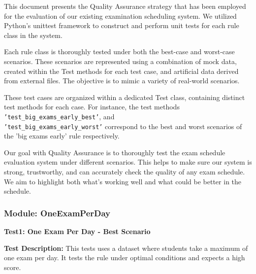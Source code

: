  This document presents the Quality Assurance strategy that has been employed for the evaluation
of our existing examination scheduling system. We utilized Python's unittest framework to
construct and perform unit tests for each rule class in the system.


\vspace{\baselineskip}

Each rule class is thoroughly tested under both the best-case and worst-case scenarios. These
scenarios are represented using a combination of mock data, created within the Test methods for
each test case, and artificial data derived from external files. The objective is to mimic a variety of
real-world scenarios.


\vspace{\baselineskip}

These test cases are organized within a dedicated Test class, containing distinct test methods for
each case. For instance, the test methods \texttt{'test\_big\_exams\_early\_best'},  and  \\ 
\texttt{'test\_big\_exams\_early\_worst'} correspond to the best and worst scenarios of the 'big exams early'
rule respectively.



\vspace{\baselineskip}

Our goal with Quality Assurance is to thoroughly test the exam schedule evaluation system under
different scenarios. This helps to make sure our system is strong, trustworthy, and can accurately
check the quality of any exam schedule. We aim to highlight both what's working well and what
could be better in the schedule.

\subsubsection{Module: OneExamPerDay}

 
\vspace{\baselineskip}

 
\textbf{Test1: One Exam Per Day - Best Scenario}


\vspace{\baselineskip}

 
 \textbf{Test Description:}
This tests uses a dataset where students take a maximum of one exam
per day. It tests the rule under optimal conditions and expects a high score.

\vspace{\baselineskip}


